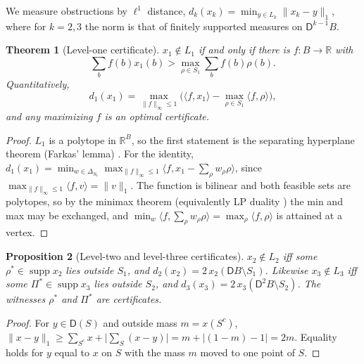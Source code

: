 \documentclass[11pt]{article}
\newtheorem{theorem}{Theorem}[section]
\newtheorem{proposition}[theorem]{Proposition}
\theoremstyle{definition}
\theoremstyle{remark}
\newcommand{\D}{\mathsf{D}}
\begin{document}
We measure obstructions by $\ell^1$ distance, $d_k(x_k)=\min_{y\in L_k}\lVert x_k-y\rVert_1$, where for
$k=2,3$ the norm is that of finitely supported measures on $\D^{k-1}B$.

\begin{theorem}[Level-one certificate]\label{thm:cert1}
$x_1\notin L_1$ if and only if there is $f\colon B\to\mathbb{R}$ with
\[
\textstyle\sum_bf(b)x_1(b)>\max_{\rho\in S_1}\sum_bf(b)\rho(b).
\]
Quantitatively,
\[
d_1(x_1)=\max_{\lVert f\rVert_\infty\le1}\Big(\langle f,x_1\rangle-\max_{\rho\in S_1}\langle f,\rho\rangle\Big),
\]
and any maximizing $f$ is an optimal certificate.
\end{theorem}
\begin{proof}
$L_1$ is a polytope in $\mathbb{R}^B$, so the first statement is the separating hyperplane theorem
(Farkas' lemma) \cite{Schrijver1986}. For the identity,
$d_1(x_1)=\min_{w\in\Delta_{S_1}}\max_{\lVert f\rVert_\infty\le1}\langle f,x_1-\sum_\rho w_\rho\rho\rangle$, since
$\max_{\lVert f\rVert_\infty\le1}\langle f,v\rangle=\lVert v\rVert_1$. The function is bilinear and both
feasible sets are polytopes, so by the minimax theorem (equivalently LP duality \cite{Schrijver1986})
the min and max may be exchanged, and $\min_w\langle f,\sum_\rho w_\rho\rho\rangle=\max_\rho\langle
f,\rho\rangle$ is attained at a vertex.
\end{proof}

\begin{proposition}[Level-two and level-three certificates]\label{prop:cert23}
$x_2\notin L_2$ iff some $\rho^\ast\in\operatorname{supp}x_2$ lies outside $S_1$, and
$d_2(x_2)=2\,x_2(\D B\setminus S_1)$. Likewise $x_3\notin L_3$ iff some
$\Pi^\ast\in\operatorname{supp}x_3$ lies outside $S_2$, and $d_3(x_3)=2\,x_3(\D^2B\setminus S_2)$.
The witnesses $\rho^\ast$ and $\Pi^\ast$ are certificates.
\end{proposition}
\begin{proof}
For $y\in\D(S)$ and outside mass $m=x(S^c)$, $\lVert x-y\rVert_1\ge\sum_{S^c}x+\big|\sum_S(x-y)\big|=
m+|(1-m)-1|=2m$. Equality holds for $y$ equal to $x$ on $S$ with the mass $m$ moved to one point of $S$.
\end{proof}
\end{document}
